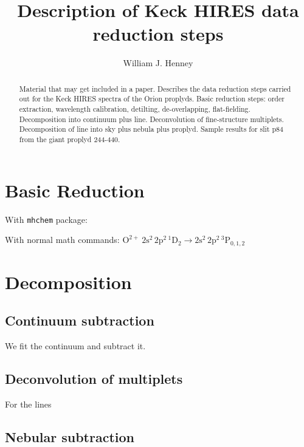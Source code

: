 \documentclass[useAMS,usenatbib]{mn2e}
\title{Description of Keck HIRES data reduction steps}
\author{William J. Henney}
\begin{document}
\maketitle
\begin{abstract}
  Material that may get included in a paper.  
  Describes the data reduction steps carried out for the 
  Keck HIRES spectra of the Orion proplyds.
  Basic reduction steps: 
  order extraction, wavelength calibration, detilting,
  de-overlapping, flat-fielding.  
  Decomposition into continuum plus line.  
  Deconvolution of fine-structure multiplets. 
  Decomposition of line into sky plus nebula plus proplyd. 
  Sample results for slit p84 
  from the giant proplyd 244-440. 
\end{abstract}

\section{Basic Reduction}
\label{sec:basic}




With \texttt{mhchem} package: 

With normal math commands:
\(
\mathrm{O^{2+}\ 2s^2\,2p^2\,{}^1D_2 \to 2s^2\,2p^2\,{}^3P_{0,1,2}}
\)

\section{Decomposition}
\label{sec:decomp}

\subsection{Continuum subtraction}
\label{sec:cont}

We fit the continuum and subtract it. 

\subsection{Deconvolution of multiplets}
\label{sec:deconv}


For the  lines 

\subsection{Nebular subtraction}
\label{sec:neb}
\end{document}
